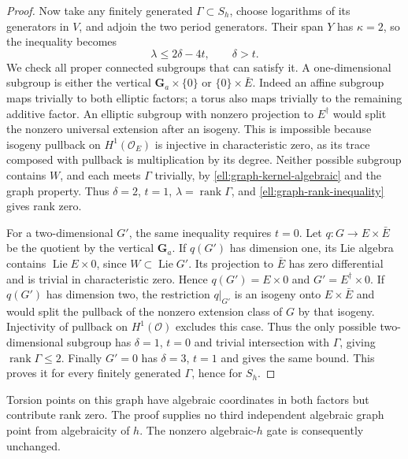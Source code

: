 \begin{proof}
Now take any finitely generated $\Gamma\subset S_h$, choose
logarithms of its generators in $V$, and adjoin the two period
generators. Their span $Y$ has $\kappa=2$, so the inequality becomes
\begin{equation}\label{ell:graph-rank-inequality}
 \lambda\le2\delta-4t,\qquad\delta>t.
\end{equation}
We check all proper connected subgroups that can satisfy it.
A one-dimensional subgroup is either the vertical
$\mathbf G_a\times\{0\}$ or $\{0\}\times\bar E$.
Indeed an affine subgroup maps trivially to both elliptic factors;
a torus also maps trivially to the remaining additive factor.
An elliptic subgroup with nonzero projection to $E^\dagger$ would
split the nonzero universal extension after an isogeny. This is
impossible because isogeny pullback on $H^1(\mathcal O_E)$ is
injective in characteristic zero, as its trace composed with
pullback is multiplication by its degree.
Neither possible subgroup contains $W$, and each meets $\Gamma$
trivially, by \eqref{ell:graph-kernel-algebraic} and the graph
property. Thus $\delta=2$, $t=1$, $\lambda=\operatorname{rank}\Gamma$,
and \eqref{ell:graph-rank-inequality} gives rank zero.

For a two-dimensional $G'$, the same inequality requires $t=0$.
Let $q:G\to E\times\bar E$ be the quotient by the vertical
$\mathbf G_a$. If $q(G')$ has dimension one, its Lie algebra contains
$\operatorname{Lie}E\times0$, since $W\subset\operatorname{Lie}G'$.
Its projection to $\bar E$ has zero differential and is trivial in
characteristic zero. Hence $q(G')=E\times0$ and
$G'=E^\dagger\times0$. If $q(G')$ has dimension two, the restriction
$q|_{G'}$ is an isogeny onto $E\times\bar E$ and would split the
pullback of the nonzero extension class of $G$ by that isogeny.
Injectivity of pullback on $H^1(\mathcal O)$ excludes this case.
Thus the only possible two-dimensional subgroup has
$\delta=1$, $t=0$ and trivial intersection with $\Gamma$, giving
$\operatorname{rank}\Gamma\le2$.
Finally $G'=0$ has $\delta=3$, $t=1$ and gives the same bound.
This proves it for every finitely generated $\Gamma$, hence for $S_h$.
\end{proof}

Torsion points on this graph have algebraic coordinates in both
factors but contribute rank zero. The proof supplies no third
independent algebraic graph point from algebraicity of $h$.
The nonzero algebraic-$h$ gate is consequently unchanged.
